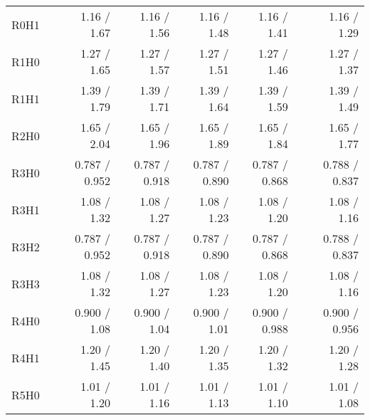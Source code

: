 \begin{table}[ht]
\begin{centering}
{\begin{tabular}{|l|l|r|r|r|r|r|r|}
R0H1                            &                                                                       &   1.16 / 1.67 &   1.16 / 1.56 &   1.16 / 1.48 &   1.16 / 1.41 &               &   1.16 / 1.29 \\
R1H0                            &                                                                       &   1.27 / 1.65 &   1.27 / 1.57 &   1.27 / 1.51 &   1.27 / 1.46 &               &   1.27 / 1.37 \\
R1H1                            &                                                                       &   1.39 / 1.79 &   1.39 / 1.71 &   1.39 / 1.64 &   1.39 / 1.59 &               &   1.39 / 1.49 \\
R2H0                            &                                                                       &   1.65 / 2.04 &   1.65 / 1.96 &   1.65 / 1.89 &   1.65 / 1.84 &               &   1.65 / 1.77 \\
R3H0                            &                                                                       & 0.787 / 0.952 & 0.787 / 0.918 & 0.787 / 0.890 & 0.787 / 0.868 &               & 0.788 / 0.837 \\
R3H1                            &                                                                       &   1.08 / 1.32 &   1.08 / 1.27 &   1.08 / 1.23 &   1.08 / 1.20 &               &   1.08 / 1.16 \\
R3H2                            &                                                                       & 0.787 / 0.952 & 0.787 / 0.918 & 0.787 / 0.890 & 0.787 / 0.868 &               & 0.788 / 0.837 \\
R3H3                            &                                                                       &   1.08 / 1.32 &   1.08 / 1.27 &   1.08 / 1.23 &   1.08 / 1.20 &               &   1.08 / 1.16 \\
R4H0                            &                                                                       &  0.900 / 1.08 &  0.900 / 1.04 &  0.900 / 1.01 & 0.900 / 0.988 &               & 0.900 / 0.956 \\
R4H1                            &                                                                       &   1.20 / 1.45 &   1.20 / 1.40 &   1.20 / 1.35 &   1.20 / 1.32 &               &   1.20 / 1.28 \\
R5H0                            &                                                                       &   1.01 / 1.20 &   1.01 / 1.16 &   1.01 / 1.13 &   1.01 / 1.10 &               &   1.01 / 1.08 \\

\end{tabular}}
\end{centering}
\end{table}
